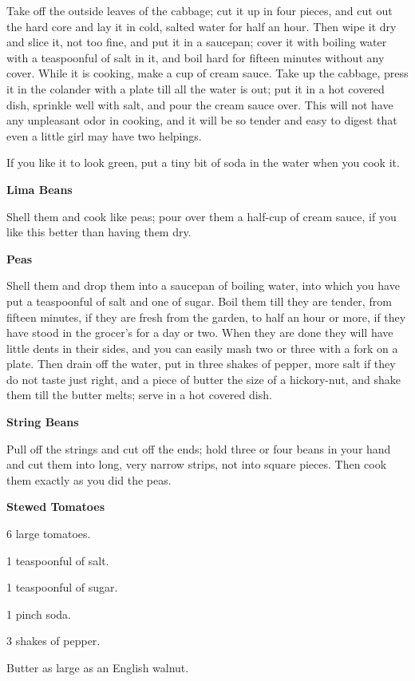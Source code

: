 \documentclass[11pt]{book}
\newcommand{\indpar}{\par\noindent\hspace*{\parindent}}
\newcommand{\ingredient}{\indpar}
\newcommand{\instruction}{\indpar}
\newenvironment{RecipeTitle}{\medskip\begin{center}\large\bf }{\end{center}\smallskip}
\begin{document}
\instruction  Take off the outside leaves of the cabbage; cut it up in
four pieces, and cut out the hard core and lay it in cold,
salted water for half an hour.  Then wipe it dry and slice
it, not too fine, and put it in a saucepan; cover it with
boiling water with a teaspoonful of salt in it, and boil
hard for fifteen minutes without any cover.  While it is
cooking, make a cup of cream sauce.  Take up the cabbage,
press it in the colander with a plate till all the water
is out; put it in a hot covered dish, sprinkle well with
salt, and pour the cream sauce over.  This will not have
any unpleasant odor in cooking, and it will be so tender
and easy to digest that even a little girl may have two
helpings.
\instruction  If you like it to look green, put a tiny bit of soda
in the water when you cook it.
\begin{RecipeTitle}
Lima Beans\label{lima_beans}
\end{RecipeTitle}
  Shell them and cook like peas; pour over them a half-cup
of cream sauce, if you like this better than having them dry.
\begin{RecipeTitle}
Peas\label{peas}
\end{RecipeTitle}
\instruction  Shell them and drop them into a saucepan of boiling water,
into which you have put a teaspoonful of salt and one of
sugar.  Boil them till they are tender, from fifteen
minutes, if they are fresh from the garden, to half an
hour or more, if they have stood in the grocer's for a
day or two.  When they are done they will have little
dents in their sides, and you can easily mash two or three
with a fork on a plate.  Then drain off the water, put in
three shakes of pepper, more salt if they do not taste just
right, and a piece of butter the size of a hickory-nut,
and shake them till the butter melts; serve in a hot
covered dish.
\begin{RecipeTitle}
String Beans\label{string_beans}
\end{RecipeTitle}
\instruction  Pull off the strings and cut off the ends; hold three or
four beans in your hand and cut them into long, very narrow
strips, not into square pieces.  Then cook them exactly as
you did the peas.\pagebreak[4]
\begin{RecipeTitle}
Stewed Tomatoes\label{stewed_tomatoes}
\end{RecipeTitle}
\ingredient  6 large tomatoes.
\ingredient  1 teaspoonful of salt.
\ingredient  1 teaspoonful of sugar.
\ingredient  1 pinch soda.
\ingredient  3 shakes of pepper.
\ingredient  Butter as large as an English walnut.
\end{document}
